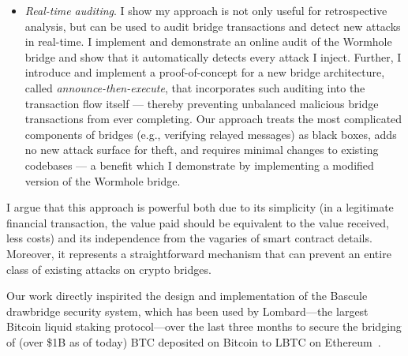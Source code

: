 \begin{itemize}
\item\emph{Real-time auditing}.  I show my approach is not only
  useful for retrospective analysis, but can be used to audit bridge
  transactions and detect new attacks in real-time. I implement and
  demonstrate an online audit of the Wormhole bridge and show that it
  automatically detects every attack I inject.  Further, I introduce
  and implement a proof-of-concept for a new bridge architecture,
  called \emph{announce-then-execute}, that incorporates such auditing
  into the transaction flow itself --- thereby preventing unbalanced
  malicious bridge transactions from ever completing.  Our approach
  treats the most complicated components of bridges (e.g., verifying
  relayed messages) as black boxes, adds no new attack surface for
  theft, and requires minimal changes to existing codebases --- a benefit
  which I demonstrate by implementing a modified version of the
  Wormhole bridge.
\end{itemize}

I argue that this approach is powerful both due to its simplicity (in a
legitimate financial transaction, the value paid should be equivalent
to the value received, less costs) and its independence from the
vagaries of smart contract details.  Moreover, it represents a
straightforward mechanism that can prevent an entire class of
existing attacks on crypto bridges.

Our work directly inspirited the design and implementation of the Bascule
drawbridge security system, which has been used by Lombard---the largest
Bitcoin
 liquid staking protocol---over the last three months to secure the
bridging of
 (over \$1B as of today) BTC deposited on Bitcoin to LBTC on
Ethereum~\cite{bascule}.


